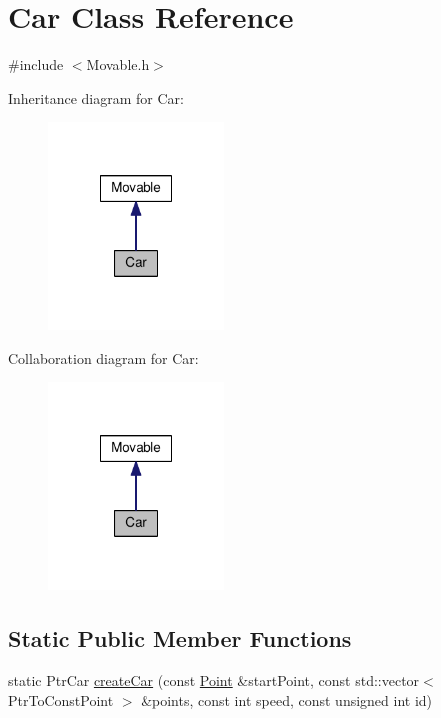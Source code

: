 \hypertarget{classCar}{\section{Car Class Reference}
\label{classCar}
}


{\ttfamily \#include $<$Movable.\-h$>$}



Inheritance diagram for Car\-:
\nopagebreak
\begin{figure}[H]
\begin{center}
\leavevmode
\includegraphics[width=132pt]{classCar__inherit__graph}
\end{center}
\end{figure}


Collaboration diagram for Car\-:
\nopagebreak
\begin{figure}[H]
\begin{center}
\leavevmode
\includegraphics[width=132pt]{classCar__coll__graph}
\end{center}
\end{figure}
\subsection*{Static Public Member Functions}
\begin{DoxyCompactItemize}
\item 
static Ptr\-Car \hyperlink{classCar_a50ad84260f3062f98b0b61c59d98dca2}{create\-Car} (const \hyperlink{classPoint}{Point} \&start\-Point, const std\-::vector$<$ Ptr\-To\-Const\-Point $>$ \&points, const int speed, const unsigned int id)
\end{DoxyCompactItemize}
